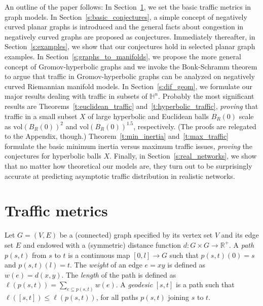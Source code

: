 \documentclass{article}
\newcommand{\vol}{\mathrm{vol}}
\begin{document}
An outline of the paper follows: 
In Section~\ref{s:basic_def}, 
we set the basic traffic metrics in graph models. 
In Section~\ref{s:basic_conjectures}, 
a simple concept of negatively curved planar graphs is introduced and 
the general facts about congestion in negatively curved graphs are proposed as conjectures.  
Immediately thereafter, in Section~\ref{s:examples}, 
we show that our conjectures hold 
in selected planar graph examples. In Section~\ref{s:graphs_to_manifolds}, 
we propose the more general concept of Gromov-hyperbolic graphs and 
we invoke the Bonk-Schramm theorem to argue that 
traffic in Gromov-hyperbolic graphs can be analyzed on negatively curved Riemannian manifold models. 
In Section~\ref{s:dif_geom}, we formulate our major results dealing with traffic in  
subsets of $\mathbb{H}^n$. 
Probably the most significant results are Theorems~\ref{t:euclidean_traffic} and~\ref{t:hyperbolic_traffic}, 
{\it proving} that traffic in a small subset $X$ of large hyperbolic and Euclidean balls $B_R(0)$ scale 
as $\vol(B_R(0))^2$ and $\vol(B_R(0))^{1.5}$, respectively.  
(The proofs are relegated to the Appendix, though.)  
Theorem~\ref{t:min_inertia}
and~\ref{t:max_traffic} formulate the basic minimum inertia versus maximum traffic issues, 
{\it proving} the conjectures for hyperbolic balls $X$.  
Finally, in Section~\ref{s:real_networks}, we show that no matter how theoretical our models are, 
they turn out to be surprisingly accurate at predicting asymptotic traffic distribution 
in realistic networks. 





\noindent 
\section{Traffic metrics}
\label{s:basic_def}



Let $G=(V,E)$ be a (connected) graph specified by its vertex set $V$ and its edge set $E$ and endowed with a (symmetric) distance function $d:G\times G\to \mathbb{R}^{+} $. A \textit{path} $p(s,t)$ from $s$ to $t$ is a continuous map $[0,l]\to G$ such that $p(s,t)(0)=s$ and $p(s,t)(l)=t$. The \textit{weight} of an edge $e=xy$ is defined as $w(e)=d(x,y)$. The \textit{length} of the path is defined as $\ell (p(s,t))=\sum _{e\subseteq p(s,t)}w(e) $. A \textit{geodesic} $[s,t]$ is a path such that $\ell \left(\left[s,t\right]\right)\le \ell \left(p\left(s,t\right)\right)$, for all paths $p(s,t)$ joining $s$ to $t$. 
\end{document}
